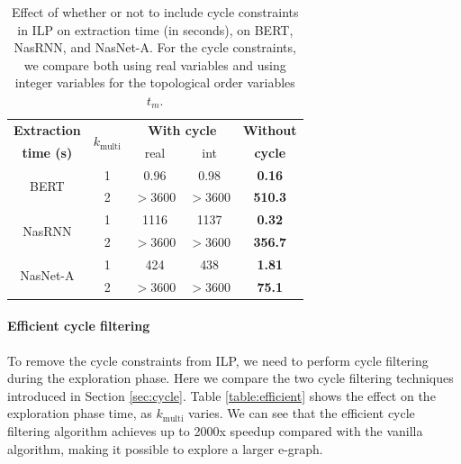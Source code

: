 \documentclass{article}
\begin{document}
\begin{table}[]
    \centering
    \footnotesize
    \begin{tabular}{ccccc}
    \toprule
        {\bf Extraction} & \multirow{2}{*}{\bf $k_{\textrm{multi}}$} & \multicolumn{2}{c}{\bf With cycle} & {\bf Without} \\
        {\bf time (s)} & & real & int & {\bf cycle} \\
    \midrule
       \multirow{2}{*}{BERT} & 1 & 0.96 & 0.98 & \textbf{0.16} \\
       & 2 & $>$3600 & $>$3600 & \textbf{510.3} \\
       \midrule
       \multirow{2}{*}{NasRNN} & 1 & 1116 & 1137 & \textbf{0.32}  \\
       & 2 & $>$3600 & $>$3600 & \textbf{356.7}  \\
       \midrule
       \multirow{2}{*}{NasNet-A} & 1 & 424 & 438 & \textbf{1.81}  \\
       & 2 & $>$3600 & $>$3600 & \textbf{75.1}  \\
    \bottomrule
    \end{tabular}
    \caption{Effect of whether or not to include cycle constraints in ILP on extraction time (in seconds), on BERT, NasRNN, and NasNet-A. 
    For the cycle constraints, we compare both using real variables and using integer variables for the topological order variables $t_m$. }
    \label{table:cycle}
\end{table}

\paragraph{Efficient cycle filtering}

To remove the cycle constraints from ILP, we need to perform cycle filtering during the exploration phase. 
Here we compare the two cycle filtering techniques introduced in Section \ref{sec:cycle}. 
Table \ref{table:efficient} shows the effect on the exploration phase time, as $k_{\textrm{multi}}$ varies.
We can see that the efficient cycle filtering algorithm achieves up to 2000x speedup compared with the vanilla algorithm, making it possible to explore a larger e-graph. 
\end{document}
